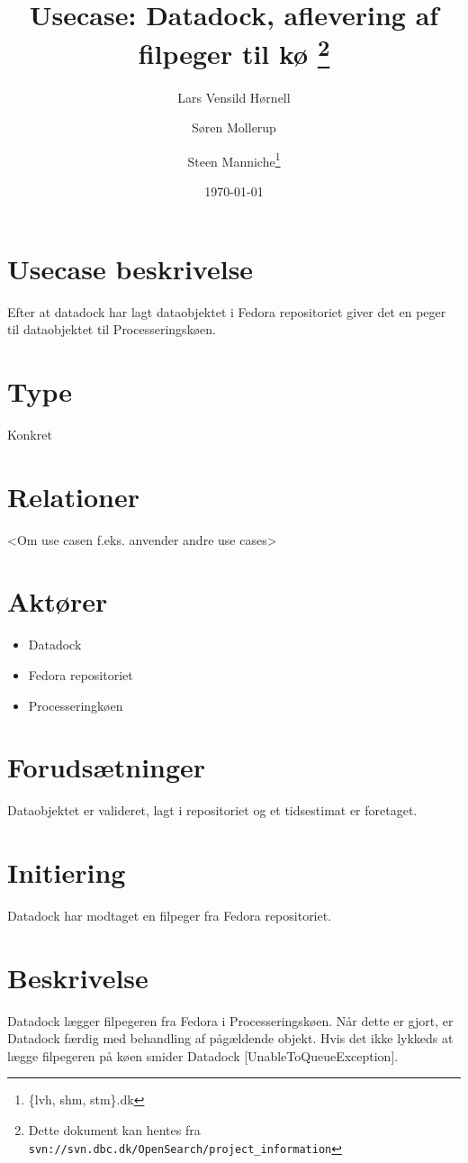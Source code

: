 \documentclass{article}
\author{Lars Vensild Hørnell \and Søren Mollerup \and Steen
  Manniche\thanks{\{lvh, shm, stm\}\@dbc.dk}}
\date{\today}
\title{Usecase: Datadock, aflevering af filpeger til kø \thanks{Dette dokument kan hentes fra \texttt{svn://svn.dbc.dk/OpenSearch/project\_information}}}
\begin{document}
\maketitle

\newpage

\tableofcontents

\section{Usecase beskrivelse}

Efter at datadock har lagt dataobjektet i Fedora repositoriet giver
det en peger til dataobjektet til Processeringskøen. 

\section{Type}
Konkret


\section{Relationer}
<Om use casen f.eks. anvender andre use cases>


\section{Aktører}

\begin{itemize}
\item Datadock
\item Fedora repositoriet
\item Processeringkøen
\end{itemize}

\section{Forudsætninger}
Dataobjektet er valideret, lagt i repositoriet og et tidsestimat er
foretaget. 


\section{Initiering}
Datadock har modtaget en filpeger fra Fedora repositoriet.


\section{Beskrivelse}
Datadock lægger filpegeren fra Fedora i Processeringskøen. Når dette
er gjort, er Datadock færdig med behandling af pågældende objekt. Hvis
det ikke lykkeds at lægge filpegeren på køen smider Datadock
[UnableToQueueException].  
\end{document}
